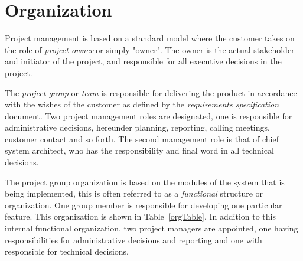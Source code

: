 \section{Organization}
Project management is based on a standard model where the customer takes on the role of \emph{project owner} or simply "owner". The owner is the actual stakeholder and initiator of the project, and responsible for all executive decisions in the project. 

The \emph{project group} or \emph{team} is responsible for delivering the product in accordance with the wishes of the customer as defined by the \emph{requirements specification} document. Two project management roles are designated, one is responsible for administrative decisions, hereunder planning, reporting, calling meetings, customer contact and so forth. The second management role is that of chief system architect, who has the responsibility and final word in all technical decisions.

The project group organization is based on the modules of the system that is being implemented, this is often referred to as a \emph{functional} structure or organization. One group member is responsible for developing one particular feature. This organization is shown in Table~\ref{orgTable}. In addition to this internal functional organization, two project managers are appointed, one having responsibilities for administrative decisions and reporting and one with responsible for technical decisions.


